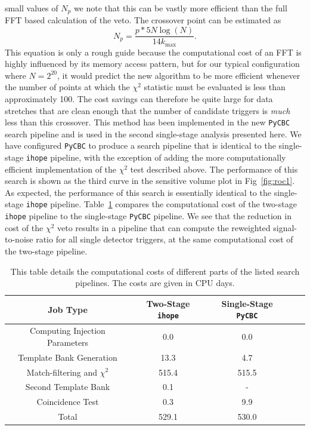 \documentclass[12pt]{iopart} \usepackage{graphicx,amssymb}
\begin{document}
small values of $N_p$ we note that this can be vastly more efficient than the
full FFT based calculation of the veto. The crossover point can be estimated
as
\begin{equation}
 N_p = \frac{p * 5N \log(N)}{14 k_\mathrm{max}}.
\end{equation}
This equation is only a rough guide because the computational cost of an FFT is
highly influenced by its memory access pattern, but for our typical
configuration where $N = 2^{20}$, it would predict the new algorithm to be more
efficient whenever the number of points at which the $\chi^2$ statistic must be evaluated is
less than approximately 100.  The cost savings can therefore be quite large for data stretches
that are clean enough that the number of candidate triggers is \emph{much} less than this crossover.
This method has been implemented in the new \texttt{PyCBC} search pipeline and is used
in the second single-stage analysis presented here. We have configured
\texttt{PyCBC} to produce a search pipeline that is 
identical to the single-stage \texttt{ihope} pipeline, with the exception of
adding the more computationally efficient implementation of the $\chi^2$ test
described above. The performance of this search is shown as the 
third curve in the sensitive volume plot in Fig~\ref{fig:roc1}. As expected,
the performance of this search is essentially identical to the single-stage
\texttt{ihope} pipeline. Table~\ref{table:cost} compares the computational
cost of the two-stage \texttt{ihope} pipeline to the single-stage \texttt{PyCBC}
pipeline. We see that the reduction in cost of the $\chi^2$ veto results
in a pipeline that can compute the reweighted signal-to-noise ratio for all 
single detector triggers, at the same computational cost of the two-stage pipeline.
\begin{table}[tbh]
\begin{center}
\begin{tabular}{|c|c|c|c|c|}
\hline 									
Job Type & Two-Stage \texttt{ihope} &	Single-Stage \texttt{PyCBC} \\\hline
Computing Injection Parameters  &       0.0     &       0.0	\\ \hline
Template Bank Generation        &       13.3    &       4.7	\\ \hline
Match-filtering and $\chi^2$    &	515.4	&       515.5	\\ \hline
Second Template Bank            &	0.1	&       -	\\ \hline
Coincidence Test                &	0.3	&       9.9	\\ \hline
Total                           &	529.1	&       530.0	\\ \hline
\end{tabular}		
\end{center}
\caption{This table details the computational costs of different parts of the
listed search pipelines. The costs are given in CPU days.}
\label{table:cost}
\end{table}
\end{document}
